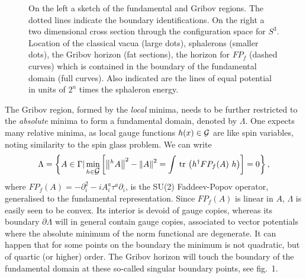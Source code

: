 \documentclass[12pt]{book}
\newcommand{\beq}{\begin{equation}}
\newcommand{\eeq}{\end{equation}}
\newcommand{\norm}[1]{\left\| #1 \right\|}
\newcommand{\tr}{\mbox{\,tr\,}}
\newcommand{\Gm}{\Gamma}
\newcommand{\Lm}{\Lambda}
\newcommand{\Ss}[1]{\mbox{$\cal #1$}}
\newcommand{\pr}{\partial}
\newcommand{\site}[1]{\refnote{\cite{#1}}}
\begin{document}
\begin{figure}{\tt}
\vspace{6.3cm}
\caption{On the left a sketch of the fundamental and Gribov regions. The
dotted lines indicate the boundary identifications. On the right a two
dimensional cross section through the configuration space for $S^3$. Location
of the classical vacua (large dots), sphalerons (smaller dots), the Gribov
horizon (fat sections), the horizon for $FP_f$ (dashed curves) which is
contained in the boundary of the fundamental domain (full curves). Also
indicated are the lines of equal potential in units of $2^n$ times the
sphaleron energy.}
\label{fig:fig1}
\end{figure}

The Gribov region, formed by the {\em local} minima, needs to be further 
restricted to the {\em absolute} minima to form a fundamental domain, denoted 
by $\Lambda$. One expects many relative minima, as local gauge functions 
$h(x)\in\Ss{G}$ are like spin variables, noting similarity to the spin glass 
problem. We can write
\beq
  \Lm=\left\{A\in\Gm|\min_{h\in\Ss{G}}\left[\norm{^hA}^2-\norm{A}^2=\int\tr
  \left(h^\dagger FP_f(A)~h\right)\right]=0\right\},\label{FPhalfdef}
\eeq
where $FP_f(A)=-\pr_i^2-i A^a_i\tau^a\pr_i$, is the SU(2) Faddeev-Popov 
operator, generalised to the fundamental representation. Since $FP_f(A)$ is 
linear in $A$, $\Lm$ is easily seen to be convex. Its interior is devoid of 
gauge copies, whereas its boundary $\partial\Lambda$ will in general contain 
gauge copies, associated to vector potentials where the absolute minimum of 
the norm functional are degenerate\site{vba3}. It can happen that for some 
points on the boundary the minimum is not quadratic, but of quartic (or higher)
order. The Gribov horizon will touch the boundary of the fundamental domain at 
these so-called singular boundary points, see fig.~1.
\end{document}
